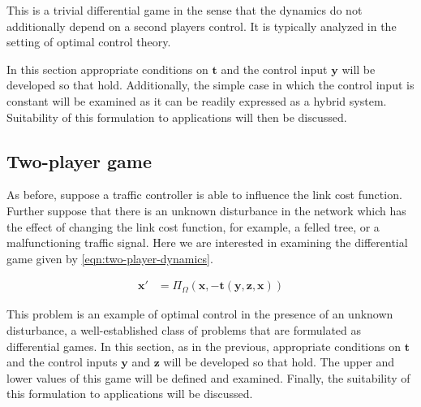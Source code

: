 This is a trivial differential game in the sense that the dynamics do not additionally depend on a second players control.
It is typically analyzed in the setting of optimal control theory. \citep{bardi2008optimal}

In this section appropriate conditions on $\mathbf{t}$ and the control input $\mathbf{y}$ will be developed so that  hold.
Additionally, the simple case in which the control input is constant will be examined as it can be readily expressed as a hybrid system.
Suitability of this formulation to applications will then be discussed.

\subsection{Two-player game}

As before, suppose a traffic controller is able to influence the link cost function.
Further suppose that there is an unknown disturbance in the network which has the effect of changing the link cost function, for example, a felled tree, or a malfunctioning traffic signal.
Here we are interested in examining the differential game given by \eqref{eqn:two-player-dynamics}.

\begin{align}
    \mathbf{x}' &= \Pi_{\Omega} (\mathbf{x}, -\mathbf{t}(\mathbf{y}, \mathbf{z}, \mathbf{x}))\label{eqn:two-player-dynamics}
\end{align}

This problem is an example of optimal control in the presence of an unknown disturbance, a well-established class of problems that are formulated as differential games. \citep{bardi2008optimal}
In this section, as in the previous, appropriate conditions on $\mathbf{t}$ and the control inputs $\mathbf{y}$ and $\mathbf{z}$ will be developed so that  hold.
The upper and lower values of this game will be defined and examined.
Finally, the suitability of this formulation to applications will be discussed.